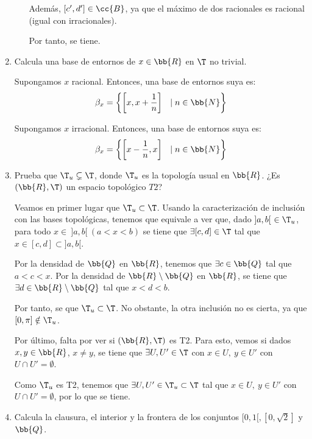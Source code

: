 \begin{ejercicio}
\begin{enumerate}[label=\alph*)]
\begin{enumerate}
            Además, $[c', d']\in \cc{B}$, ya que el máximo de dos racionales es racional (igual con irracionales).

            Por tanto, se tiene.
        \end{enumerate}

        \item Calcula una base de entornos de $x\in \bb{R}$ en $\T$ no trivial.

        Supongamos $x$ racional. Entonces, una base de entornos suya es:
        \begin{equation*}
            \beta_x=\left\{\left[x,x+\frac{1}{n}\right]~~ \mid n\in \bb{N}\right\}
        \end{equation*}

        Supongamos $x$ irracional. Entonces, una base de entornos suya es:
        \begin{equation*}
            \beta_x=\left\{\left[x-\frac{1}{n},x\right]~~ \mid n\in \bb{N}\right\}
        \end{equation*}

        \item Prueba que $\T_u\subsetneq \T$, donde $\T_u$ es la topología usual en $\bb{R}$. ¿Es $(\bb{R},\T)$ un espacio topológico $T2$?


        Veamos en primer lugar que $\T_u\subset \T$. Usando la caracterización de inclusión con las bases topológicas, tenemos que equivale a ver que, dado $]a,b[~\in \T_u$, para todo $x\in~ ]a,b[~ (a<x<b)$ se tiene que $\exists [c,d]\in \T$ tal que $x\in [c,d]\subset ]a,b[$.

        Por la densidad de $\bb{Q}$ en $\bb{R}$, tenemos que $\exists c\in \bb{Q}$ tal que $a<c<x$. Por la densidad de $\bb{R}\setminus\bb{Q}$ en $\bb{R}$, se tiene que $\exists d\in \bb{R}\setminus\bb{Q}$ tal que $x<d<b$.
        
        Por tanto, se que $\T_u\subset \T$. No obstante, la otra inclusión no es cierta, ya que $[0,\pi]\notin \T_u$.


        Por último, falta por ver si $(\bb{R},\T)$ es T2. Para esto, vemos si dados $x,y\in \bb{R}$, $x\neq y$, se tiene que $\exists U,U'\in \T$ con $x\in U,~ y\in U'$ con $U\cap U'=\emptyset$.

        Como $\T_u$ es T2, tenemos que $\exists U,U'\in \T_u\subset \T$ tal que $x\in U,~ y\in U'$ con $U\cap U'=\emptyset$, por lo que se tiene.
        

        \item Calcula la clausura, el interior y la frontera de los conjuntos $[0,1[, [0,\sqrt{2}]$ y $\bb{Q}$.


\end{enumerate}
\end{ejercicio}
